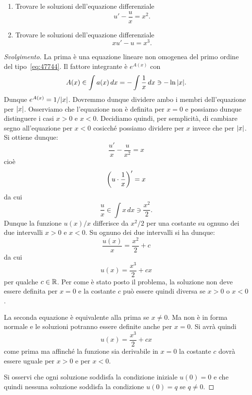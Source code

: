 \begin{exercise}
\begin{enumerate}
\item
Trovare le soluzioni dell'equazione differenziale
\[
  u' - \frac{u}{x} = x^2.
\]

\item
Trovare le soluzioni dell'equazione differenziale
\[
  x u' - u = x^3.
\]
\end{enumerate}
\end{exercise}
\begin{proof}[Svolgimento]
La prima è una equazione lineare non omogenea del primo ordine
del tipo~\eqref{eq:47744}. Il fattore integrante è $e^{A(x)}$ con
\[
  A(x) \in \int a(x)\, dx = -\int \frac{1}{x}\, dx \ni - \ln {\left|x\right|}.
\]
Dunque $e^{A(x)} = 1/{\left|x\right|}$. Dovremmo dunque dividere ambo i membri dell'equazione per ${\left|x\right|}$. Osserviamo che l'equazione non è definita per $x=0$ e possiamo dunque distinguere i casi $x>0$ e $x<0$. Decidiamo quindi, per semplicità, di cambiare segno all'equazione per $x<0$ cosicché possiamo dividere per $x$ invece che per ${\left|x\right|}$.
Si ottiene dunque:
\[
  \frac{u'}{x} - \frac{u}{x^2} = x
\]
cioè
\[
  {\left( u\cdot \frac{1}{x} \right)}'  = x
\]
da cui
\[
  \frac{u}{x} \in \int x\, dx \ni \frac{x^2}{2}.
\]
Dunque la funzione $u(x)/x$ differisce da $x^2/2$ per una costante su ognuno dei due intervalli $x>0$ e $x<0$. Su ognuno dei due intervalli si ha dunque:
\[
  \frac{u(x)}{x} = \frac{x^2}{2} + c
\]
da cui
\[
  u(x) = \frac{x^3}{2} + c x
\]
per qualche $c\in {\mathbb R}$. Per come è stato posto il problema, la soluzione non deve essere definita per $x=0$ e la costante $c$ può essere quindi diversa se $x>0$ o $x<0$.

La seconda equazione è equivalente alla prima se $x\neq 0$. Ma non è in forma normale e le soluzioni
potranno essere definite anche per $x=0$.
Si avrà quindi
\[
  u(x) = \frac{x^3}{2} + c x
\]
come prima ma affinché la funzione sia derivabile in $x=0$ la costante $c$ dovrà essere uguale per $x>0$ e per $x<0$.

Si osservi che ogni soluzione soddisfa la condizione iniziale $u(0) = 0$ 
e che quindi nessuna soluzione soddisfa la condizione $u(0)= q$ se $q \neq 0$.
\end{proof}

